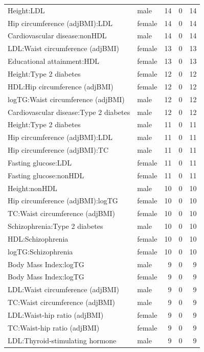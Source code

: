 \begin{table}[ht]
\begin{tabular}{llrrr}
  Height:LDL & male &  14 &   0 &  14 \\ 
  Hip circumference (adjBMI):LDL & female &  14 &   0 &  14 \\ 
  Cardiovascular disease:nonHDL & male &  14 &   0 &  14 \\ 
  LDL:Waist circumference (adjBMI) & female &  13 &   0 &  13 \\ 
  Educational attainment:HDL & female &  13 &   0 &  13 \\ 
  Height:Type 2 diabetes & female &  12 &   0 &  12 \\ 
  HDL:Hip circumference (adjBMI) & female &  12 &   0 &  12 \\ 
  logTG:Waist circumference (adjBMI) & male &  12 &   0 &  12 \\ 
  Cardiovascular disease:Type 2 diabetes & male &  12 &   0 &  12 \\ 
  Height:Type 2 diabetes & male &  11 &   0 &  11 \\ 
  Hip circumference (adjBMI):LDL & male &  11 &   0 &  11 \\ 
  Hip circumference (adjBMI):TC & male &  11 &   0 &  11 \\ 
  Fasting glucose:LDL & female &  11 &   0 &  11 \\ 
  Fasting glucose:nonHDL & female &  11 &   0 &  11 \\ 
  Height:nonHDL & male &  10 &   0 &  10 \\ 
  Hip circumference (adjBMI):logTG & female &  10 &   0 &  10 \\ 
  TC:Waist circumference (adjBMI) & female &  10 &   0 &  10 \\ 
  Schizophrenia:Type 2 diabetes & male &  10 &   0 &  10 \\ 
  HDL:Schizophrenia & female &  10 &   0 &  10 \\ 
  logTG:Schizophrenia & female &  10 &   0 &  10 \\ 
  Body Mass Index:logTG & male &   9 &   0 &   9 \\ 
  Body Mass Index:logTG & female &   9 &   0 &   9 \\ 
  LDL:Waist circumference (adjBMI) & male &   9 &   0 &   9 \\ 
  TC:Waist circumference (adjBMI) & male &   9 &   0 &   9 \\ 
  LDL:Waist-hip ratio (adjBMI) & female &   9 &   0 &   9 \\ 
  TC:Waist-hip ratio (adjBMI) & female &   9 &   0 &   9 \\ 
  LDL:Thyroid-stimulating hormone & male &   9 &   0 &   9 \\ 

\end{tabular}
\end{table}
